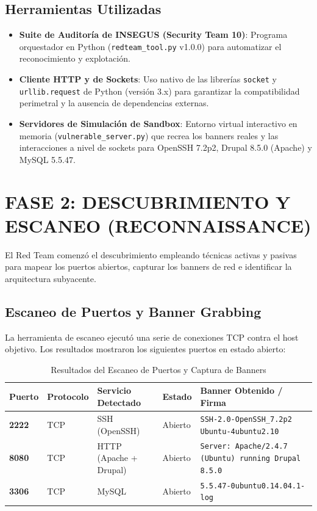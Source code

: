 \documentclass[11pt,a4paper]{article}
\begin{document}
\subsection{Herramientas Utilizadas}
\begin{itemize}
    \item \textbf{Suite de Auditoría de INSEGUS (Security Team 10)}: Programa orquestador en Python (\texttt{redteam\_tool.py} v1.0.0) para automatizar el reconocimiento y explotación.
    \item \textbf{Cliente HTTP y de Sockets}: Uso nativo de las librerías \texttt{socket} y \texttt{urllib.request} de Python (versión 3.x) para garantizar la compatibilidad perimetral y la ausencia de dependencias externas.
    \item \textbf{Servidores de Simulación de Sandbox}: Entorno virtual interactivo en memoria (\texttt{vulnerable\_server.py}) que recrea los banners reales y las interacciones a nivel de sockets para OpenSSH 7.2p2, Drupal 8.5.0 (Apache) y MySQL 5.5.47.
\end{itemize}


\section{FASE 2: DESCUBRIMIENTO Y ESCANEO (RECONNAISSANCE)}
El Red Team comenzó el descubrimiento empleando técnicas activas y pasivas para mapear los puertos abiertos, capturar los banners de red e identificar la arquitectura subyacente.

\subsection{Escaneo de Puertos y Banner Grabbing}
La herramienta de escaneo ejecutó una serie de conexiones TCP contra el host objetivo. Los resultados mostraron los siguientes puertos en estado abierto:

\begin{table}[h]
    \centering
    \caption{Resultados del Escaneo de Puertos y Captura de Banners}
    \vspace{0.2cm}
    \begin{tabular}{lllll}
        \toprule
        \textbf{Puerto} & \textbf{Protocolo} & \textbf{Servicio Detectado} & \textbf{Estado} & \textbf{Banner Obtenido / Firma} \\
        \midrule
        \textbf{2222} & TCP & SSH (OpenSSH) & Abierto & \texttt{SSH-2.0-OpenSSH\_7.2p2 Ubuntu-4ubuntu2.10} \\
        \textbf{8080} & TCP & HTTP (Apache + Drupal) & Abierto & \texttt{Server: Apache/2.4.7 (Ubuntu) running Drupal 8.5.0} \\
        \textbf{3306} & TCP & MySQL & Abierto & \texttt{5.5.47-0ubuntu0.14.04.1-log} \\
        \bottomrule
    \end{tabular}
\end{table}
\end{document}
